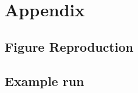 \appendix
\part*{Appendix}
\chapter{Figure Reproduction}\label{apdx:figure_repoduction}



\chapter{Example  run}\label{apdx:eg_run}

